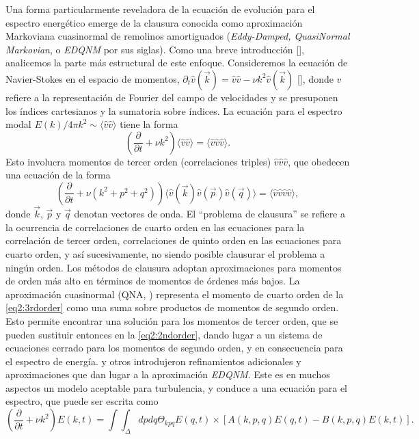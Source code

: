 Una forma particularmente reveladora de la ecuación de evolución para
el espectro energético emerge de la clausura conocida como
aproximación Markoviana cuasinormal de remolinos amortiguados
(\textit{Eddy-Damped, QuasiNormal Markovian}, o \textit{EDQNM} por sus
siglas). Como una breve introducción [\cite{orszag_analytical_1970,
monin_statistical_2013, mccomb_physics_1990,
lesieur_turbulence_2008}], analicemos la parte más estructural de este
enfoque. Consideremos la ecuación de Navier-Stokes en el espacio de
momentos, $\partial_t \hat{v}(\vec{k}) = \hat{v}\hat{v} - \nu k^2
\hat{v}(\vec{k})$ [\cite{lesieur_turbulence_2008}], donde $\hat{v}$
refiere a la representación de Fourier del campo de velocidades y se
presuponen los índices cartesianos y la sumatoria sobre índices. La
ecuación para el espectro modal $E(k)/4\pi k^2 \sim \langle
\hat{v}\hat{v} \rangle$ tiene la forma
\begin{equation}\label{eq2:2ndorder}
  \left(\frac{\partial}{\partial t} + \nu k^2 \right) \langle \hat{v} \hat{v} \rangle
  = \langle \hat{v} \hat{v} \hat{v} \rangle.
\end{equation}
Esto involucra momentos de tercer orden (correlaciones triples)
$\hat{v}\hat{v}\hat{v}$, que obedecen una ecuación de la forma
\begin{equation}\label{eq2:3rdorder}
  \left(\frac{\partial}{\partial t} + \nu \left(k^2+p^2+q^2\right) \right) \langle \hat{v}(\vec{k}) \hat{v}(\vec{p}) \hat{v}(\vec{q}) \rangle = \langle \hat{v} \hat{v} \hat{v} \hat{v} \rangle,
\end{equation}
donde $\vec{k}$, $\vec{p}$ y $\vec{q}$ denotan vectores de onda. El
``problema de clausura'' se refiere a la ocurrencia de correlaciones
de cuarto orden en las ecuaciones para la correlación de tercer orden,
correlaciones de quinto orden en las ecuaciones para cuarto orden, y
así sucesivamente, no siendo posible clausurar el problema a ningún
orden. Los métodos de clausura adoptan aproximaciones para momentos de
orden más alto en términos de momentos de órdenes más bajos. La
aproximación cuasinormal (QNA, \cite{millionshchikov_1941}) representa
el momento de cuarto orden de la \cref{eq2:3rdorder} como una suma
sobre productos de momentos de segundo orden. Esto permite encontrar
una solución para los momentos de tercer orden, que se pueden
sustituir entonces en la \cref{eq2:2ndorder}, dando lugar a un sistema
de ecuaciones cerrado para los momentos de segundo orden, y en
consecuencia para el espectro de
energía. \cite{orszag_analytical_1970} y otros introdujeron
refinamientos adicionales y aproximaciones que dan lugar a la
aproximación \textit{EDQNM}. Este es en muchos aspectos un modelo
aceptable para turbulencia, y conduce a una ecuación para el espectro,
que puede ser escrita como
\begin{equation}\label{eq2:spectrumeq}
  \left( \frac{\partial}{\partial t} + \nu k^2 \right) E(k, t) = \int\int_\Delta dp dq \Theta_{kpq} E(q,t) \times \left[ A(k, p, q) E(q, t) - B(k, p, q) E(k, t)\right].
\end{equation}

